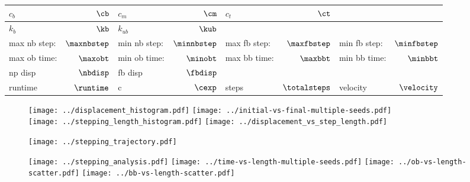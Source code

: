 \documentclass[]{article}
\begin{document}
\begin{table}[tbhp]
  \centering
  \begin{tabular}{|lr|lr|lr|lr|}
    \toprule
    $c_b$ & $\cb$ &
    $c_m$ & $\cm$ &
    $c_t$ & $\ct$ & &\\
    \midrule
    $k_b$ & $\kb$ &
    $k_{ub}$ & $\kub$ & & & &\\
    \midrule
    max nb step: & $\maxnbstep$ &
    min nb step: & $\minnbstep$ &
    max fb step: & $\maxfbstep$ &
    min fb step: & $\minfbstep$\\
    \midrule
    max ob time: & $\maxobt$ &
    min ob time: & $\minobt$ &
    max bb time: & $\maxbbt$ &
    min bb time: & $\minbbt$\\
    \midrule
    np disp & $\nbdisp$ &
    fb disp & $\fbdisp$ & & & &\\
    \midrule
    runtime & $\runtime$ &
    c & $\cexp$ &
    steps & $\totalsteps$ &
    velocity & $\velocity$\\
    \midrule
  \end{tabular}
\end{table}

\begin{figure}[tbhp]
  \centering
  \texttt{[image: ../displacement\_histogram.pdf]}%
  \texttt{[image: ../initial-vs-final-multiple-seeds.pdf]}\\
  \texttt{[image: ../stepping\_length\_histogram.pdf]}%
  \texttt{[image: ../displacement\_vs\_step\_length.pdf]}
\end{figure}

\begin{figure}[tbhp]
  \texttt{[image: ../stepping\_trajectory.pdf]}
\end{figure}

\begin{figure}[tbhp]
  \texttt{[image: ../stepping\_analysis.pdf]}%
  \texttt{[image: ../time-vs-length-multiple-seeds.pdf]}
  \texttt{[image: ../ob-vs-length-scatter.pdf]}%
  \texttt{[image: ../bb-vs-length-scatter.pdf]}
\end{figure}
\end{document}
